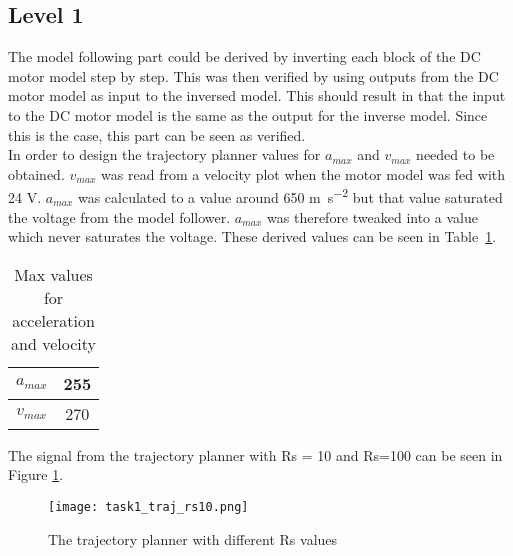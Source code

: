 %
%
%
%
%
\subsection*{Level 1}
The model following part could be derived by inverting each block of the DC
motor model step by step. This was then verified by using outputs from the DC
motor model as input to the inversed model. This should result in that
the input to the DC motor model is the same as the output for the
inverse model. Since this is the case, this part can be seen as
verified. \\

In order to design the trajectory planner values for $a_{max}$ and
$v_{max}$ needed to be obtained. $v_{max}$ was read from a velocity plot
when the motor model was fed with 24 V. $a_{max}$ was calculated to a
value around 650 \si{\meter\per\square\second} but that value saturated the voltage from the model
follower. $a_{max}$ was therefore tweaked into a value which never
saturates the voltage. These derived values can be seen in
Table~\ref{tbl:table1}.
\begin{table}[H]
    \centering
    \caption{Max values for acceleration and velocity}
	\begin{tabular}{| c | c |}
        \hline
	    $a_{max}$ & 255 \\ \hline
		$v_{max}$ & 270 \\ 
		\hline
	\end{tabular}
        \label{tbl:table1}
\end{table}

The signal from the trajectory planner with Rs = 10 and Rs=100 can be seen in Figure \ref{fig:task2_pos}.

\begin{figure}[H]
	\begin{center}
	
		\texttt{[image: task1\_traj\_rs10.png]}
		\caption{The trajectory planner with different Rs values}
		\label{fig:task2_pos}
	\end{center}
\end{figure}


%
